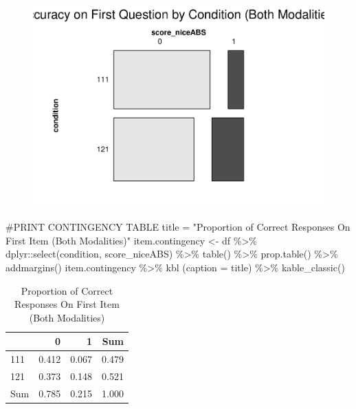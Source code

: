 \documentclass[
  letterpaper,
  DIV=11,
  numbers=noendperiod]{scrreprt}
\newenvironment{Shaded}{\begin{snugshade}}{\end{snugshade}}
\newcommand{\AttributeTok}[1]{\textcolor[rgb]{0.40,0.45,0.13}{#1}}
\newcommand{\CommentTok}[1]{\textcolor[rgb]{0.37,0.37,0.37}{#1}}
\newcommand{\FunctionTok}[1]{\textcolor[rgb]{0.28,0.35,0.67}{#1}}
\newcommand{\NormalTok}[1]{\textcolor[rgb]{0.00,0.23,0.31}{#1}}
\newcommand{\OtherTok}[1]{\textcolor[rgb]{0.00,0.23,0.31}{#1}}
\newcommand{\SpecialCharTok}[1]{\textcolor[rgb]{0.37,0.37,0.37}{#1}}
\newcommand{\StringTok}[1]{\textcolor[rgb]{0.13,0.47,0.30}{#1}}
\begin{document}
\begin{figure}[H]

{\centering \includegraphics{analysis/SGC3A/5_sgc3A_exploration_files/figure-pdf/VIS-LR-Q1.tri.by.Cond-2.pdf}

}

\end{figure}

\begin{Shaded}
\begin{Highlighting}[]
\CommentTok{\#PRINT CONTINGENCY TABLE}
\NormalTok{title }\OtherTok{=} \StringTok{"Proportion of Correct Responses On First Item (Both Modalities)"}
\NormalTok{item.contingency }\OtherTok{\textless{}{-}}\NormalTok{  df }\SpecialCharTok{\%\textgreater{}\%}\NormalTok{ dplyr}\SpecialCharTok{::}\FunctionTok{select}\NormalTok{(condition, score\_niceABS) }\SpecialCharTok{\%\textgreater{}\%} \FunctionTok{table}\NormalTok{() }\SpecialCharTok{\%\textgreater{}\%} \FunctionTok{prop.table}\NormalTok{() }\SpecialCharTok{\%\textgreater{}\%} \FunctionTok{addmargins}\NormalTok{()}
\NormalTok{item.contingency }\SpecialCharTok{\%\textgreater{}\%} \FunctionTok{kbl}\NormalTok{ (}\AttributeTok{caption =}\NormalTok{ title) }\SpecialCharTok{\%\textgreater{}\%} \FunctionTok{kable\_classic}\NormalTok{()}
\end{Highlighting}
\end{Shaded}

\begin{table}

\caption{Proportion of Correct Responses On First Item (Both Modalities)}
\centering
\begin{tabular}[t]{l|r|r|r}
\hline
  & 0 & 1 & Sum\\
\hline
111 & 0.412 & 0.067 & 0.479\\
\hline
121 & 0.373 & 0.148 & 0.521\\
\hline
Sum & 0.785 & 0.215 & 1.000\\
\hline
\end{tabular}
\end{table}
\end{document}
